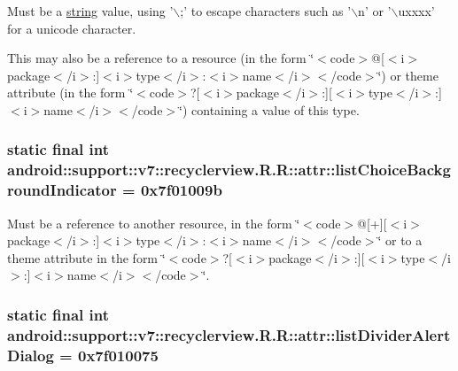 Must be a \hyperlink{classandroid_1_1support_1_1v7_1_1recyclerview_1_1_r_1_1string}{string} value, using '$\backslash$;' to escape characters such as '$\backslash$n' or '$\backslash$uxxxx' for a unicode character. 

This may also be a reference to a resource (in the form \char`\"{}$<$code$>$@\mbox{[}$<$i$>$package$<$/i$>$:\mbox{]}$<$i$>$type$<$/i$>$:$<$i$>$name$<$/i$>$$<$/code$>$\char`\"{}) or theme attribute (in the form \char`\"{}$<$code$>$?\mbox{[}$<$i$>$package$<$/i$>$:\mbox{]}\mbox{[}$<$i$>$type$<$/i$>$:\mbox{]}$<$i$>$name$<$/i$>$$<$/code$>$\char`\"{}) containing a value of this type. \hypertarget{classandroid_1_1support_1_1v7_1_1recyclerview_1_1_r_1_1attr_2c24ef2561c2fdcbce0cde041af793b8}{
\subsubsection[{listChoiceBackgroundIndicator}]{\setlength{\rightskip}{0pt plus 5cm}static final int android::support::v7::recyclerview.R.R::attr::listChoiceBackgroundIndicator = 0x7f01009b}}
\label{classandroid_1_1support_1_1v7_1_1recyclerview_1_1_r_1_1attr_2c24ef2561c2fdcbce0cde041af793b8}


Must be a reference to another resource, in the form \char`\"{}$<$code$>$@\mbox{[}+\mbox{]}\mbox{[}$<$i$>$package$<$/i$>$:\mbox{]}$<$i$>$type$<$/i$>$:$<$i$>$name$<$/i$>$$<$/code$>$\char`\"{} or to a theme attribute in the form \char`\"{}$<$code$>$?\mbox{[}$<$i$>$package$<$/i$>$:\mbox{]}\mbox{[}$<$i$>$type$<$/i$>$:\mbox{]}$<$i$>$name$<$/i$>$$<$/code$>$\char`\"{}. \hypertarget{classandroid_1_1support_1_1v7_1_1recyclerview_1_1_r_1_1attr_1687057df1099a185a057ae49684e239}{
\subsubsection[{listDividerAlertDialog}]{\setlength{\rightskip}{0pt plus 5cm}static final int android::support::v7::recyclerview.R.R::attr::listDividerAlertDialog = 0x7f010075}}
\label{classandroid_1_1support_1_1v7_1_1recyclerview_1_1_r_1_1attr_1687057df1099a185a057ae49684e239}


